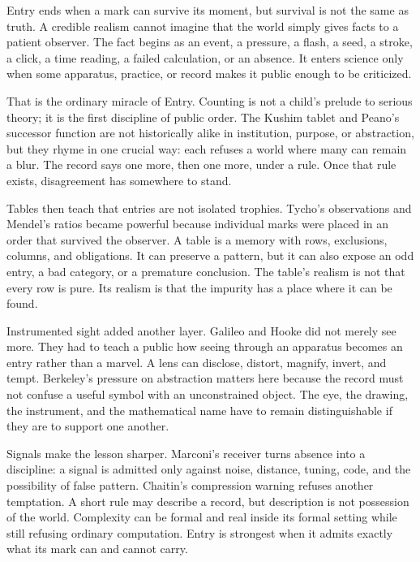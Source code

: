 \begin{movementclose}
Entry ends when a mark can survive its moment, but survival is not the same as
truth. A credible realism cannot imagine that the world simply gives facts to a
patient observer. The fact begins as an event, a pressure, a flash, a seed, a
stroke, a click, a time reading, a failed calculation, or an absence. It enters
science only when some apparatus, practice, or record makes it public enough to
be criticized.

That is the ordinary miracle of Entry. Counting is not a child's prelude to
serious theory; it is the first discipline of public order. The Kushim tablet
and Peano's successor function are not historically alike in institution,
purpose, or abstraction, but they rhyme in one crucial way: each refuses a
world where many can remain a blur. The record says one more, then one more,
under a rule. Once that rule exists, disagreement has somewhere to stand.

Tables then teach that entries are not isolated trophies. Tycho's observations
and Mendel's ratios became powerful because individual marks were placed in an
order that survived the observer. A table is a memory with rows, exclusions,
columns, and obligations. It can preserve a pattern, but it can also expose an
odd entry, a bad category, or a premature conclusion. The table's realism is
not that every row is pure. Its realism is that the impurity has a place where
it can be found.

Instrumented sight added another layer. Galileo and Hooke did not merely see
more. They had to teach a public how seeing through an apparatus becomes an
entry rather than a marvel. A lens can disclose, distort, magnify, invert, and
tempt. Berkeley's pressure on abstraction matters here because the record must
not confuse a useful symbol with an unconstrained object. The eye, the drawing,
the instrument, and the mathematical name have to remain distinguishable if
they are to support one another.

Signals make the lesson sharper. Marconi's receiver turns absence into a
discipline: a signal is admitted only against noise, distance, tuning, code,
and the possibility of false pattern. Chaitin's compression warning refuses
another temptation. A short rule may describe a record, but description is not
possession of the world. Complexity can be formal and real inside its formal
setting while still refusing ordinary computation. Entry is strongest when it
admits exactly what its mark can and cannot carry.


\end{movementclose}
